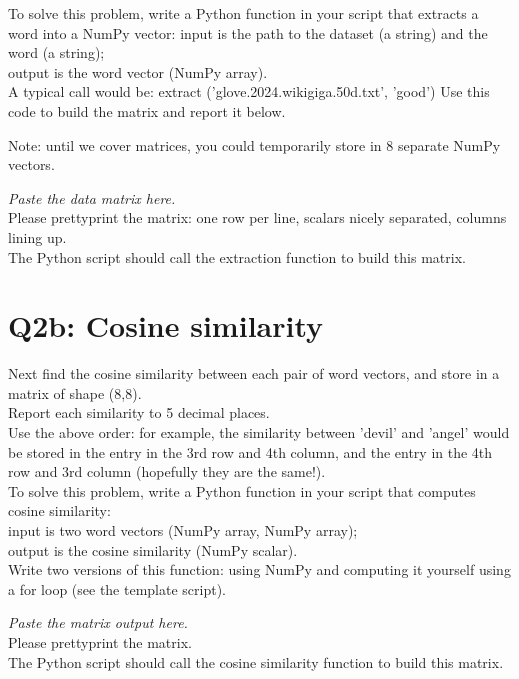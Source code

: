 \documentclass[10pt]{article}
\renewcommand{\(}{\left(}
\renewcommand{\)}{\right)}
\theoremstyle{plain}
\theoremstyle{plain}
\theoremstyle{definition}
\begin{document}
      To solve this problem,
      write a Python function in your script
      that extracts a word into a NumPy vector:
      input is the path to the dataset (a string) and the word (a string);\\
      output is the word vector (NumPy array).\\
      A typical call would be:
      extract ('glove.2024.wikigiga.50d.txt', 'good')
      Use this code to build the matrix and report it below.

      Note: until we cover matrices, you could temporarily store 
      in 8 separate NumPy vectors.

      \begin{shaded}
      {\em Paste the data matrix here.}\\
       Please prettyprint the matrix: 
       one row per line, scalars nicely separated, columns lining up.\\
       The Python script should call the extraction function 
       to build this matrix.
      \end{shaded}

\section*{Q2b: Cosine similarity}

      Next find the cosine similarity 
      between each pair of word vectors,
      and store in a matrix of shape (8,8).\\
      Report each similarity to 5 decimal places.\\
      Use the above order: for example, the similarity between
      'devil' and 'angel' would be stored in the
      entry in the 3rd row and 4th column, 
      and the entry in the 4th row and 3rd column
      (hopefully they are the same!).\\

      To solve this problem,
      write a Python function in your script
      that computes cosine similarity:\\
      input is two word vectors (NumPy array, NumPy array);\\
      output is the cosine similarity (NumPy scalar).\\
      Write two versions of this function: using NumPy 
      and computing it yourself using a for loop (see the template script).
      
      \begin{shaded}
      {\em Paste the matrix output here.}\\
      Please prettyprint the matrix.\\
      The Python script should call the cosine similarity function 
      to build this matrix.
      \end{shaded}
\end{document}
